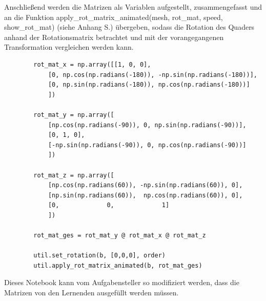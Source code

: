 Anschließend werden die Matrizen als Variablen aufgestellt, zusammengefasst und an die Funktion
apply\_rot\_matrix\_animated(mesh, rot\_mat, speed, show\_rot\_mat) (siehe Anhang S.\pageref{sec:apply_rot_matrix_animated}) übergeben, sodass
die Rotation des Quaders anhand der Rotationsmatrix betrachtet und mit der vorangegangenen Transformation vergleichen werden kann.

\begin{center}
    \begin{verbatim}
        rot_mat_x = np.array([[1, 0, 0],
            [0, np.cos(np.radians(-180)), -np.sin(np.radians(-180))],
            [0, np.sin(np.radians(-180)), np.cos(np.radians(-180))]
            ])

        rot_mat_y = np.array([
            [np.cos(np.radians(-90)), 0, np.sin(np.radians(-90))],
            [0, 1, 0],
            [-np.sin(np.radians(-90)), 0, np.cos(np.radians(-90))]
            ])

        rot_mat_z = np.array([
            [np.cos(np.radians(60)), -np.sin(np.radians(60)), 0],
            [np.sin(np.radians(60)),  np.cos(np.radians(60)), 0],
            [0,             0,             1]
            ])

        rot_mat_ges = rot_mat_y @ rot_mat_x @ rot_mat_z

        util.set_rotation(b, [0,0,0], order)
        util.apply_rot_matrix_animated(b, rot_mat_ges)
    \end{verbatim}
\end{center}

Dieses Notebook kann vom Aufgabensteller so modifiziert werden,
dass die Matrizen von den Lernenden ausgefüllt werden müssen.


